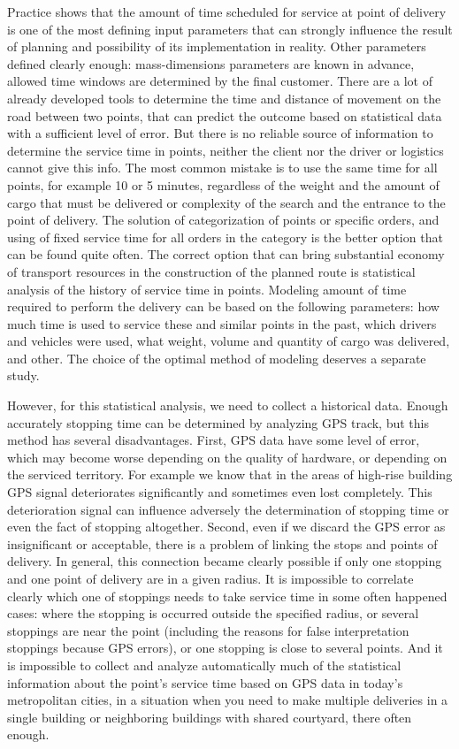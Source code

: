 Practice shows that the amount of time scheduled for service at point of delivery is one of the most defining input parameters that can strongly influence the result of planning and possibility of its implementation in reality. Other parameters defined clearly enough: mass-dimensions parameters are known in advance, allowed time windows are determined by the final customer. There are a lot of already developed tools to determine the time and distance of movement on the road between two points, that can predict the outcome based on statistical data with a sufficient level of error. But there is no reliable source of information to determine the service time in points, neither the client nor the driver or logistics cannot give this info. The most common mistake is to use the same time for all points, for example 10 or 5 minutes, regardless of the weight and the amount of cargo that must be delivered or complexity of the search and the entrance to the point of delivery. The solution of categorization of points or specific orders, and using of fixed service time for all orders in the category is the better option that can be found quite often. The correct option that can bring substantial economy of transport resources in the construction of the planned route is statistical analysis of the history of service time in points. Modeling amount of time required to perform the delivery can be based on the following parameters: how much time is used to service these and similar points in the past, which drivers and vehicles were used, what weight, volume and quantity of cargo was delivered, and other. The choice of the optimal method of modeling deserves a separate study.

However, for this statistical analysis, we need to collect a historical data. Enough accurately stopping time can be determined by analyzing GPS track, but this method has several disadvantages. First, GPS data have some level of error, which may become worse depending on the quality of hardware, or depending on the serviced territory. For example we know that in the areas of high-rise building GPS signal deteriorates significantly and sometimes even lost completely. This deterioration signal can influence adversely the determination of stopping time or even the fact of stopping altogether. Second, even if we discard the GPS error as insignificant or acceptable, there is a problem of linking the stops and points of delivery. In general, this connection became clearly possible if only one stopping and one point of delivery are in a given radius. It is impossible to correlate clearly which one of stoppings needs to take service time in some often happened cases: where the stopping is occurred outside the specified radius, or several stoppings are near the point (including the reasons for false interpretation stoppings because GPS errors), or one stopping is close to several points. And it is impossible to collect and analyze automatically much of the statistical information about the point’s service time based on GPS data in today's metropolitan cities, in a situation when you need to make multiple deliveries in a single building or neighboring buildings with shared courtyard, there often enough. 

